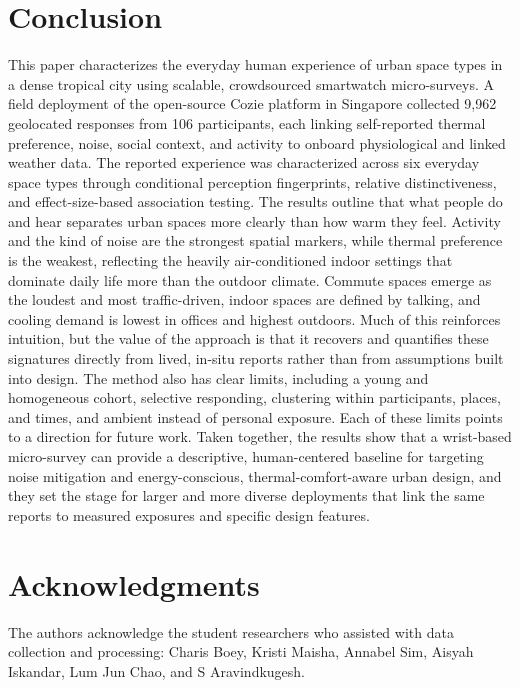\documentclass[]{interact}
\begin{document}
\section{Conclusion}\label{sec:conclusion}

This paper characterizes the everyday human experience of urban space types in a dense tropical city using scalable, crowdsourced smartwatch micro-surveys. 
A field deployment of the open-source Cozie platform in Singapore collected 9{,}962 geolocated responses from 106 participants, each linking self-reported thermal preference, noise, social context, and activity to onboard physiological and linked weather data. 
The reported experience was characterized across six everyday space types through conditional perception fingerprints, relative distinctiveness, and effect-size-based association testing.
The results outline that what people do and hear separates urban spaces more clearly than how warm they feel. 
Activity and the kind of noise are the strongest spatial markers, while thermal preference is the weakest, reflecting the heavily air-conditioned indoor settings that dominate daily life more than the outdoor climate. 
Commute spaces emerge as the loudest and most traffic-driven, indoor spaces are defined by talking, and cooling demand is lowest in offices and highest outdoors.
Much of this reinforces intuition, but the value of the approach is that it recovers and quantifies these signatures directly from lived, in-situ reports rather than from assumptions built into design. 
The method also has clear limits, including a young and homogeneous cohort, selective responding, clustering within participants, places, and times, and ambient instead of personal exposure.
Each of these limits points to a direction for future work.
Taken together, the results show that a wrist-based micro-survey can provide a descriptive, human-centered baseline for targeting noise mitigation and energy-conscious, thermal-comfort-aware urban design, and they set the stage for larger and more diverse deployments that link the same reports to measured exposures and specific design features.

\section*{Acknowledgments}
The authors acknowledge the student researchers who assisted with data collection and processing: Charis Boey, Kristi Maisha, Annabel Sim, Aisyah Iskandar, Lum Jun Chao, and S Aravindkugesh.
\end{document}
